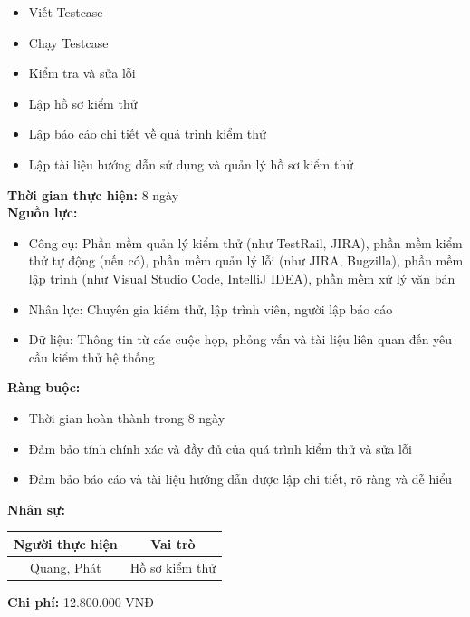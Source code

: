 {\begin{minipage}{\textwidth}
\begin{itemize}
        \begin{itemize}
            \item Viết Testcase
            \item Chạy Testcase
            \item Kiểm tra và sửa lỗi
            \item Lập hồ sơ kiểm thử
            \item Lập báo cáo chi tiết về quá trình kiểm thử
            \item Lập tài liệu hướng dẫn sử dụng và quản lý hồ sơ kiểm thử
        \end{itemize}
    \end{itemize}
    \vspace{0.5cm}
    \noindent \textbf{Thời gian thực hiện:} 8 ngày \\
    \noindent \textbf{Nguồn lực:}
    \begin{itemize}
        \item Công cụ: Phần mềm quản lý kiểm thử (như TestRail, JIRA), phần mềm kiểm thử tự động (nếu có), phần mềm quản lý lỗi (như JIRA, Bugzilla), phần mềm lập trình (như Visual Studio Code, IntelliJ IDEA), phần mềm xử lý văn bản
        \item Nhân lực: Chuyên gia kiểm thử, lập trình viên, người lập báo cáo
        \item Dữ liệu: Thông tin từ các cuộc họp, phỏng vấn và tài liệu liên quan đến yêu cầu kiểm thử hệ thống
    \end{itemize}
    \vspace{0.5cm}
    \noindent \textbf{Ràng buộc:}
    \begin{itemize}
        \item Thời gian hoàn thành trong 8 ngày
        \item Đảm bảo tính chính xác và đầy đủ của quá trình kiểm thử và sửa lỗi
        \item Đảm bảo báo cáo và tài liệu hướng dẫn được lập chi tiết, rõ ràng và dễ hiểu
    \end{itemize}
    \vspace{0.5cm}
    \noindent \textbf{Nhân sự:}
    \begin{longtable}{|c|c|}
    \hline
    \textbf{Người thực hiện} & \textbf{Vai trò} \\
    \hline
    Quang, Phát & Hồ sơ kiểm thử \\
    \hline
    \end{longtable}
    \vspace{0.5cm}
    \noindent \textbf{Chi phí:} 12.800.000 VNĐ \\

\end{minipage}}
